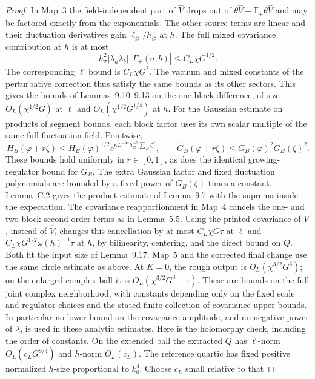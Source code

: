 \documentclass[11pt]{article}
\begin{document}
\begin{proof}
In Map~3 the field-independent part of \(\widehat V\)
drops out of
\(\theta\widehat V-\mathbb E_+\theta\widehat V\)
and may be factored exactly from the exponentials.
The other source terms are linear and their fluctuation
derivatives gain \(\ell_\varnothing/h_\varnothing\) at \(h\).
The full mixed covariance contribution at \(h\) is at
most
\[
 h_\sigma^2|\lambda_a\lambda_b|\,|\Gamma_+(a,b)|
   \le C_L\chi G^{1/2}.
\]
The corresponding \(\ell\) bound is \(C_L\chi G^2\).
The vacuum and mixed constants of the perturbative
correction thus satisfy the same bounds as its other
sectors. This gives the bounds of Lemmas~9.10--9.13 on
the one-block difference, of size
\(O_L(\chi^{1/2}G)\) at \(\ell\) and
\(O_L(\chi^{1/2}G^{1/4})\) at \(h\).
For the Gaussian estimate on products of segment
bounds, each block factor uses its own scalar multiple
of the same full fluctuation field. Pointwise,
\[
 H_B(\varphi+r\zeta)\le H_B(\varphi)^{1/2}
   e^{\kappa L^{-4s}h_\varnothing^{-2}\sum_B\zeta_x^2},
 \qquad
 \widetilde G_B(\varphi+r\zeta)
 \le \widetilde G_B(\varphi)^2\widetilde G_B(\zeta)^2 .
\]
These bounds hold uniformly in \(r\in[0,1]\), as does
the identical growing-regulator bound for \(G_B\).
The extra Gaussian factor and fixed fluctuation
polynomials are bounded by a fixed power of \(G_B(\zeta)\)
times a constant. Lemma~C.2 gives the product estimate
of Lemma~9.7 with the suprema inside the expectation.
The covariance reapportionment in Map~4 cancels the
one- and two-block second-order terms as in Lemma~5.5.
Using the printed covariance of \(V\), instead of
\(\widehat V\), changes this cancellation by at most
\(C_L\chi G\tau\) at \(\ell\) and
\(C_L\chi G^{1/2}\omega(h)^{-1}\tau\) at \(h\), by
bilinearity, centering, and the direct bound on \(Q\).
Both fit the input size of Lemma~9.17.
Map~5 and the corrected final change use the same
circle estimate as above. At \(K=0\), the rough output
is \(O_L(\chi^{3/2}G^3)\); on the enlarged complex ball
it is \(O_L(\chi^{3/2}G^3+\tau)\).
These are bounds on the full joint complex neighborhood, with
constants depending only on the fixed scale and regulator choices
and the stated finite collection of covariance upper bounds. In
particular no lower bound on the covariance amplitude, and no
negative power of \(\lambda\), is used in these analytic estimates.
Here is the holomorphy check, including the order of constants.
On the extended ball the extracted \(Q\) has \(\ell\)-norm
\(O_L(c_LG^{9/4})\) and \(h\)-norm \(O_L(c_L)\).
The reference quartic has fixed positive normalized \(h\)-size
proportional to \(k_0^4\). Choose \(c_L\) small relative to that

\end{proof}
\end{document}
